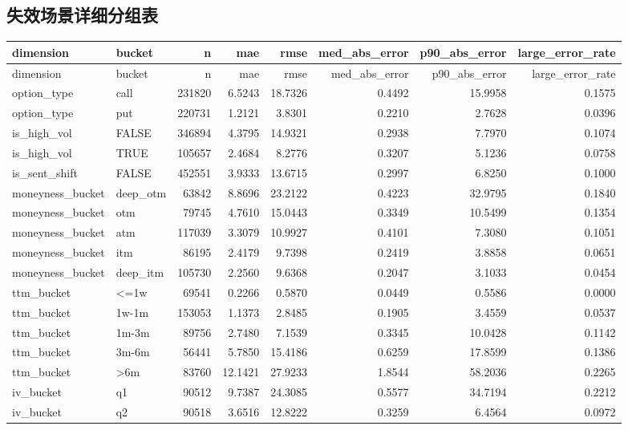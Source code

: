 \documentclass[11pt]{article}
\begin{document}
\subsection{失效场景详细分组表}
\begingroup
\scriptsize
\setlength{\tabcolsep}{4pt}
\begin{longtable}{llrrrrrr}
\toprule
dimension & bucket & n & mae & rmse & med\_abs\_error & p90\_abs\_error & large\_error\_rate \\
\midrule
\endfirsthead
\toprule
dimension & bucket & n & mae & rmse & med\_abs\_error & p90\_abs\_error & large\_error\_rate \\
\midrule
\endhead
option\_type & call & 231820 & 6.5243 & 18.7326 & 0.4492 & 15.9958 & 0.1575 \\
option\_type & put & 220731 & 1.2121 & 3.8301 & 0.2210 & 2.7628 & 0.0396 \\
is\_high\_vol & FALSE & 346894 & 4.3795 & 14.9321 & 0.2938 & 7.7970 & 0.1074 \\
is\_high\_vol & TRUE & 105657 & 2.4684 & 8.2776 & 0.3207 & 5.1236 & 0.0758 \\
is\_sent\_shift & FALSE & 452551 & 3.9333 & 13.6715 & 0.2997 & 6.8250 & 0.1000 \\
moneyness\_bucket & deep\_otm & 63842 & 8.8696 & 23.2122 & 0.4223 & 32.9795 & 0.1840 \\
moneyness\_bucket & otm & 79745 & 4.7610 & 15.0443 & 0.3349 & 10.5499 & 0.1354 \\
moneyness\_bucket & atm & 117039 & 3.3079 & 10.9927 & 0.4101 & 7.3080 & 0.1051 \\
moneyness\_bucket & itm & 86195 & 2.4179 & 9.7398 & 0.2419 & 3.8858 & 0.0651 \\
moneyness\_bucket & deep\_itm & 105730 & 2.2560 & 9.6368 & 0.2047 & 3.1033 & 0.0454 \\
ttm\_bucket & <=1w & 69541 & 0.2266 & 0.5870 & 0.0449 & 0.5586 & 0.0000 \\
ttm\_bucket & 1w-1m & 153053 & 1.1373 & 2.8485 & 0.1905 & 3.4559 & 0.0537 \\
ttm\_bucket & 1m-3m & 89756 & 2.7480 & 7.1539 & 0.3345 & 10.0428 & 0.1142 \\
ttm\_bucket & 3m-6m & 56441 & 5.7850 & 15.4186 & 0.6259 & 17.8599 & 0.1386 \\
ttm\_bucket & >6m & 83760 & 12.1421 & 27.9233 & 1.8544 & 58.2036 & 0.2265 \\
iv\_bucket & q1 & 90512 & 9.7387 & 24.3085 & 0.5577 & 34.7194 & 0.2212 \\
iv\_bucket & q2 & 90518 & 3.6516 & 12.8222 & 0.3259 & 6.4564 & 0.0972 \\

\end{longtable}
\end{document}
